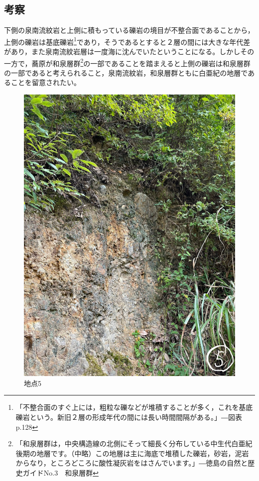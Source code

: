 \documentclass[uplatex,b5paper]{jsreport}
\begin{document}
    \subsection{考察}
    下側の泉南流紋岩と上側に積もっている礫岩の境目が不整合面であることから，上側の礫岩は基底礫岩\footnote{「不整合面のすぐ上には，粗粒な礫などが堆積することが多く，これを基底礫岩という。新旧２層の形成年代の間には長い時間間隔がある。」―図表p.128}であり，そうであるとすると２層の間には大きな年代差があり，また泉南流紋岩層は一度海に沈んでいたということになる。しかしその一方で，蕎原が和泉層群\footnote{「和泉層群は，中央構造線の北側にそって細長く分布している中生代白亜紀後期の地層です。（中略）この地層は主に海底で堆積した礫岩，砂岩，泥岩からなり，ところどころに酸性凝灰岩をはさんでいます。」―徳島の自然と歴史ガイドNo.3　和泉層群}の一部であることを踏まえると上側の礫岩は和泉層群の一部であると考えられること，泉南流紋岩，和泉層群ともに白亜紀の地層であることを留意されたい。
  \begin{figure}[h]
    \begin{center}
      \includegraphics[scale=0.2]{files/地学実習/地点5.jpg}
      \caption{地点5}
    \end{center}
  \end{figure}
  \clearpage
\end{document}
